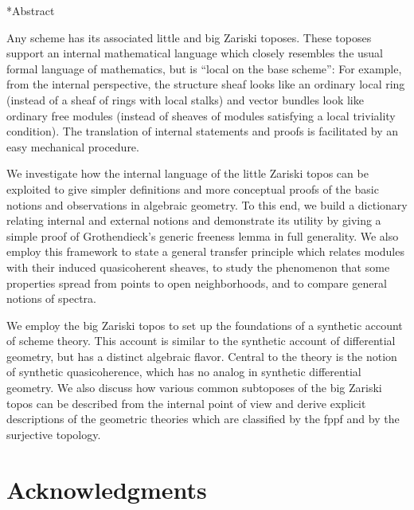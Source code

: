 \documentclass[10pt,reqno,a4paper]{amsbook}
\theoremstyle{definition}
\theoremstyle{plain}
\theoremstyle{remark}
\newcommand{\?}{\,{:}\,}
\renewcommand{\_}{\mathpunct{.}\,}
\newcommand{\nocontentsline}[3]{}
\newcommand{\tocless}[1]{\let\addcontentsline=\nocontentsline}
\begin{document}
{\tocless

\chapter*{Abstract}

Any scheme has its associated little and big Zariski toposes. These toposes
support an internal mathematical language which closely resembles the usual
formal language of mathematics, but is ``local on the base scheme'': For
example, from the internal perspective, the structure sheaf looks like an
ordinary local ring (instead of a sheaf of rings with local stalks) and vector
bundles look like ordinary free modules (instead of sheaves of modules
satisfying a local triviality condition). The translation of internal statements and
proofs is facilitated by an easy mechanical procedure.

We investigate how the internal language of the little Zariski topos
can be exploited to give simpler definitions and more conceptual
proofs of the basic notions and observations in algebraic geometry.
To this end, we build a dictionary relating internal and external notions and
demonstrate its utility by giving a simple proof of Grothendieck's generic
freeness lemma in full generality. We also employ this framework to state a
general transfer principle which relates modules with their induced quasicoherent
sheaves, to study the phenomenon that some
properties spread from points to open neighborhoods, and to compare general
notions of spectra.

We employ the big Zariski topos to set up the foundations of a synthetic account
of scheme theory. This account is similar to the synthetic account of
differential geometry, but has a distinct algebraic flavor. Central to the
theory is the notion of synthetic quasicoherence, which has no analog in
synthetic differential geometry. We also discuss how various common subtoposes
of the big Zariski topos can be described from the internal point of view and
derive explicit descriptions of the geometric theories which are
classified by the fppf and by the surjective topology.



\chapter*{Acknowledgments}

}
\end{document}
